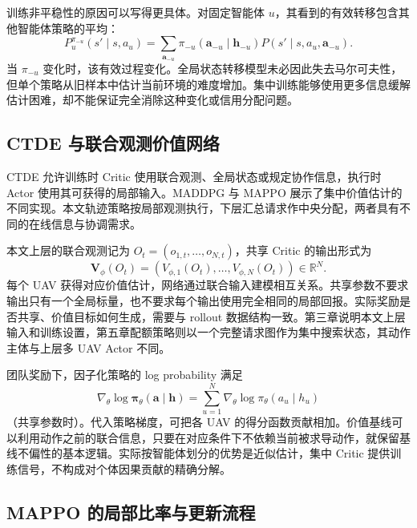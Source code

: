 训练非平稳性的原因可以写得更具体。对固定智能体 $u$，其看到的有效转移包含其他智能体策略的平均：
\begin{equation}
    P_u^{\pi_{-u}}(s'\mid s,a_u)
    =\sum_{\boldsymbol a_{-u}}\pi_{-u}(\boldsymbol a_{-u}\mid\boldsymbol h_{-u})
       P(s'\mid s,a_u,\boldsymbol a_{-u}).
    \label{eq:ch2-effective-transition}
\end{equation}
当 $\pi_{-u}$ 变化时，该有效过程变化。全局状态转移模型未必因此失去马尔可夫性，但单个策略从旧样本中估计当前环境的难度增加。集中训练能够使用更多信息缓解估计困难，却不能保证完全消除这种变化或信用分配问题。

\subsection{CTDE 与联合观测价值网络}
\label{sec:ch2-ctde}

CTDE 允许训练时 Critic 使用联合观测、全局状态或规定协作信息，执行时 Actor 使用其可获得的局部输入。MADDPG 与 MAPPO 展示了集中价值估计的不同实现\cite{lowe2017multi,yu2022surprising}。本文轨迹策略按局部观测执行，下层汇总请求作中央分配，两者具有不同的在线信息与协调需求。

本文上层的联合观测记为 $O_t=(o_{1,t},\ldots,o_{N,t})$，共享 Critic 的输出形式为
\begin{equation}
    \boldsymbol V_\phi(O_t)
    =(V_{\phi,1}(O_t),\ldots,V_{\phi,N}(O_t))\in\mathbb R^N.
    \label{eq:ch2-joint-critic}
\end{equation}
每个 UAV 获得对应价值估计，网络通过联合输入建模相互关系。共享参数不要求输出只有一个全局标量，也不要求每个输出使用完全相同的局部回报。实际奖励是否共享、价值目标如何生成，需要与 rollout 数据结构一致。第三章说明本文上层输入和训练设置，第五章配额策略则以一个完整请求图作为集中搜索状态，其动作主体与上层多 UAV Actor 不同。

团队奖励下，因子化策略的 log probability 满足
\begin{equation}
    \nabla_\theta\log\boldsymbol\pi_\theta(\boldsymbol a\mid\boldsymbol h)
    =\sum_{u=1}^{N}\nabla_\theta\log\pi_\theta(a_u\mid h_u)
    \label{eq:ch2-shared-score}
\end{equation}
（共享参数时）。代入策略梯度，可把各 UAV 的得分函数贡献相加。价值基线可以利用动作之前的联合信息，只要在对应条件下不依赖当前被求导动作，就保留基线不偏性的基本逻辑。实际按智能体划分的优势是近似估计，集中 Critic 提供训练信号，不构成对个体因果贡献的精确分解。

\subsection{MAPPO 的局部比率与更新流程}
\label{subsec:mappo}

